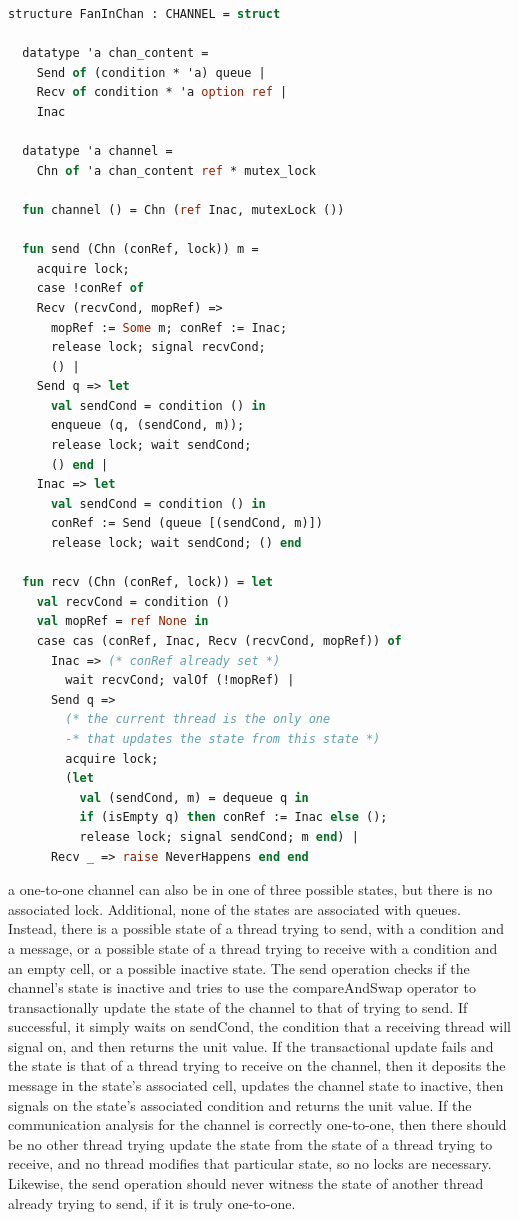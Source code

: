 \documentclass{article}
\begin{document}
\begin{lstlisting}[language=ML, escapechar=\%]
  structure FanInChan : CHANNEL = struct

  datatype 'a chan_content =
    Send of (condition * 'a) queue |
    Recv of condition * 'a option ref |
    Inac

  datatype 'a channel =
    Chn of 'a chan_content ref * mutex_lock

  fun channel () = Chn (ref Inac, mutexLock ())

  fun send (Chn (conRef, lock)) m = 
    acquire lock;
    case !conRef of
    Recv (recvCond, mopRef) => 
      mopRef := Some m; conRef := Inac;
      release lock; signal recvCond;
      () |
    Send q => let
      val sendCond = condition () in
      enqueue (q, (sendCond, m));
      release lock; wait sendCond;
      () end |
    Inac => let
      val sendCond = condition () in
      conRef := Send (queue [(sendCond, m)])
      release lock; wait sendCond; () end 

  fun recv (Chn (conRef, lock)) = let
    val recvCond = condition () 
    val mopRef = ref None in
    case cas (conRef, Inac, Recv (recvCond, mopRef)) of
      Inac => (* conRef already set *)
        wait recvCond; valOf (!mopRef) |
      Send q =>
        (* the current thread is the only one
        -* that updates the state from this state *)
        acquire lock;
        (let
          val (sendCond, m) = dequeue q in
          if (isEmpty q) then conRef := Inac else (); 
          release lock; signal sendCond; m end) |
      Recv _ => raise NeverHappens end end

  \end{lstlisting}

a one-to-one channel can also be in one of three possible states, but there is no associated
lock. Additional, none of the states are associated with queues.  Instead, there is a possible
state of a thread trying to send, with a condition and a message, or a possible state of a
thread trying to receive with a condition and an empty cell, or a possible inactive state.
The send operation checks if the channel's state is inactive and tries to use the
compareAndSwap operator to transactionally update the state of the channel to that of trying to
send.  If successful, it simply waits on sendCond, the condition that a receiving thread will
signal on, and then returns the unit value.  If the transactional update fails and the state is
that of a thread trying to receive on the channel, then it deposits the message in the state's
associated cell, updates the channel state to inactive, then signals on the state's associated
condition and returns the unit value.  If the communication analysis for the channel is
correctly one-to-one, then there should be no other thread trying update the state from the
state of a thread trying to receive, and no thread modifies that particular state, so no locks
are necessary.  Likewise, the send operation should never witness the state of another thread
already trying to send, if it is truly one-to-one.
\end{document}
